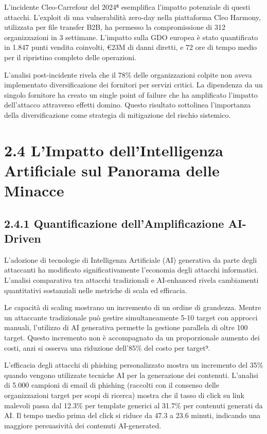 \documentclass[12pt,a4paper,oneside]{book}
\numberwithin{figure}{chapter} %
\numberwithin{table}{chapter}  %
\begin{document}
L'incidente Cleo-Carrefour del 2024⁸ esemplifica l'impatto potenziale di
questi attacchi. L'exploit di una vulnerabilità zero-day nella
piattaforma Cleo Harmony, utilizzata per file transfer B2B, ha permesso
la compromissione di 312 organizzazioni in 3 settimane. L'impatto sulla
GDO europea è stato quantificato in 1.847 punti vendita coinvolti, €23M
di danni diretti, e 72 ore di tempo medio per il ripristino completo
delle operazioni.

L'analisi post-incidente rivela che il 78\% delle organizzazioni colpite
non aveva implementato diversificazione dei fornitori per servizi
critici. La dipendenza da un singolo fornitore ha creato un single point
of failure che ha amplificato l'impatto dell'attacco attraverso effetti
domino. Questo risultato sottolinea l'importanza della diversificazione
come strategia di mitigazione del rischio sistemico.

\section{2.4 L'Impatto dell'Intelligenza Artificiale sul Panorama
delle
Minacce}\label{limpatto-dellintelligenza-artificiale-sul-panorama-delle-minacce}

\subsection{2.4.1 Quantificazione dell'Amplificazione
AI-Driven}\label{quantificazione-dellamplificazione-ai-driven}

L'adozione di tecnologie di Intelligenza Artificiale (AI) generativa da
parte degli attaccanti ha modificato significativamente l'economia degli
attacchi informatici. L'analisi comparativa tra attacchi tradizionali e
AI-enhanced rivela cambiamenti quantitativi sostanziali nelle metriche
di scala ed efficacia.

Le capacità di scaling mostrano un incremento di un ordine di grandezza.
Mentre un attaccante tradizionale può gestire simultaneamente 5-10
target con approcci manuali, l'utilizzo di AI generativa permette la
gestione parallela di oltre 100 target. Questo incremento non è
accompagnato da un proporzionale aumento dei costi, anzi si osserva una
riduzione dell'85\% del costo per target⁹.

L'efficacia degli attacchi di phishing personalizzato mostra un
incremento del 35\% quando vengono utilizzate tecniche AI per la
generazione dei contenuti. L'analisi di 5.000 campioni di email di
phishing (raccolti con il consenso delle organizzazioni target per scopi
di ricerca) mostra che il tasso di click su link malevoli passa dal
12.3\% per template generici al 31.7\% per contenuti generati da AI. Il
tempo medio prima del click si riduce da 47.3 a 23.6 minuti, indicando
una maggiore persuasività dei contenuti AI-generated.
\end{document}
